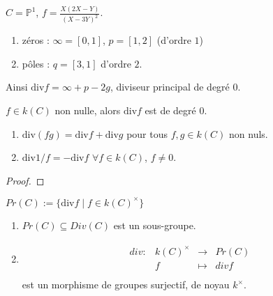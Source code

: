         \begin{expl}
            $C = \mathbb{P}^1$, $f = \frac{X(2X - Y)}{(X - 3Y)^2}$.
            \begin{enumerate}
                \item zéros : $\infty = [0,1]$, $p = [1,2]$ (d'ordre $1$)
                \item pôles : $q = [3,1]$ d'ordre $2$.
            \end{enumerate}
            Ainsi $\mathrm{div} f = \infty + p - 2g$, diviseur principal de degré $0$.
        \end{expl}
        \begin{theo}
            $f \in k(C)$ non nulle, alors $\mathrm{div} f$ est de degré $0$.
        \end{theo}
        \begin{prop}
            \begin{enumerate}
                \item $\mathrm{div} (fg) = \mathrm{div} f + \mathrm{div} g$ pour tous $f,g \in k(C)$ non nuls.
                \item $\mathrm{div} 1/f = - \mathrm{div} f$ $\forall f \in k(C)$, $f \neq 0$.
            \end{enumerate}
        \end{prop}
        \begin{proof}
        \end{proof}
        \begin{defi}
            $Pr(C) := \{\mathrm{div} f \mid f \in k(C)^\times\}$
        \end{defi}
        \begin{prop}
            \begin{enumerate}
                \item $Pr(C) \subseteq Div(C)$ est un sous-groupe.
                \item \begin{align*}
                    \begin{array}{cccc}
                        div : & k(C)^\times & \to & Pr(C) \\
                        & f & \mapsto & div f \\
                    \end{array}
                \end{align*}
                est un morphisme de groupes surjectif, de noyau $k^\times$.
            \end{enumerate}
        \end{prop}
